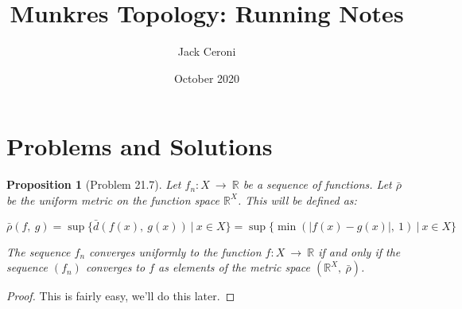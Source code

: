 \documentclass[10pt, oneside]{article}
\title{Munkres Topology: Running Notes}
\author{Jack Ceroni}
\date{October 2020}
\newtheorem{prop}{Proposition}
\begin{document}
    \maketitle
    \tableofcontents

    \vspace{.25in}
    
    \section{Problems and Solutions}

    \begin{prop}[Problem 21.7]
      Let $f_n : X \ \rightarrow \ \mathbb{R}$ be a sequence of functions. Let $\bar{\rho}$ be the uniform metric on the function space $\mathbb{R}^X$.
      This will be defined as:

      $$\bar{\rho}(f, \ g) = \sup \{ \bar{d}(f(x), \ g(x)) \ | \ x \in X\} = \sup \{ \min(|f(x) - g(x)|, \ 1) \ | \ x \in X\}$$

      The sequence $f_n$ converges uniformly to the function $f : X \ \rightarrow \ \mathbb{R}$ if and only if the sequence $(f_n)$ converges
      to $f$ as elements of the metric space $(\mathbb{R}^X, \ \bar{\rho})$.
    \end{prop}

    \begin{proof}
      This is fairly easy, we'll do this later.
    \end{proof}



    
\end{document}
